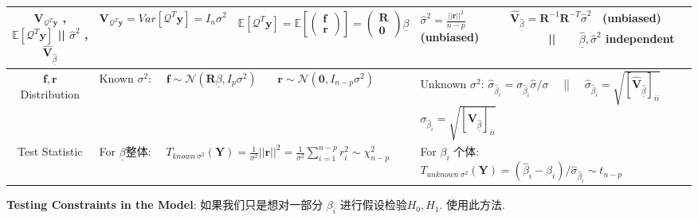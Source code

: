 \documentclass[9pt]{article}
\begin{document}
\vspace{-13pt}
{\footnotesize
\begin{longtable}{|c||l|l||l|l|}
    \hline
    {\scriptsize $\mathbf{V}_{\mathcal{Q}^T\mathbf{y}}$ , $\mathbb{E}[\mathcal{Q}^T\mathbf{y}]$ || $\widehat{\sigma}^2$ , $\widehat{\mathbf{V}}_{\underline{\widehat{\beta}}}$ } & $\mathbf{V}_{\mathcal{Q}^T\mathbf{y}}=Var[\mathcal{Q}^T\mathbf{y}]=I_n\sigma^2$ & {\tiny $\mathbb{E}[\mathcal{Q}^T\mathbf{y}]=\mathbb{E}\left[\begin{pmatrix}\mathbf{f} \\ \mathbf{r}\end{pmatrix}\right]=\begin{pmatrix}\mathbf{R} \\ \mathbf{0}\end{pmatrix}\underline{\beta}$} & $\widehat{\sigma}^2=\frac{||\mathbf{r}||^2}{n-p}$ {\tiny (unbiased)} & $\widehat{\mathbf{V}}_{\underline{\widehat{\beta}}}=\mathbf{R}^{-1}\mathbf{R}^{-T}\widehat{\sigma}^2$ \ {\tiny (unbiased)} \ \ \ \ \ \ || \ \ \ {\scriptsize $\underline{\widehat{\beta}},\widehat{\sigma}^2$ independent} \\
    \hline
    $\mathbf{f,r}$ Distribution & \multicolumn{2}{l||}{ {\scriptsize Known $\sigma^2$:} \ \ $\mathbf{f}\sim\mathcal{N}(\mathbf{R}\underline{\beta},I_p\sigma^2)$ \ \ \ $\mathbf{r}\sim\mathcal{N}(\mathbf{0},I_{n-p}\sigma^2)$} & \multicolumn{2}{l|}{ {\scriptsize Unknown $\sigma^2$:} $\widehat{\sigma}_{\widehat{\beta}_i}=\sigma_{\widehat{\beta}_i}\widehat{\sigma} / \sigma$ \ \ || \ \ $\widehat{\sigma}_{\widehat{\beta}_i}=\sqrt{[\widehat{\mathbf{V}}_{\underline{\widehat{\beta}}}]_{ii}}$ \ \ \ $\sigma_{\widehat{\beta}_i}=\sqrt{[\mathbf{V}_{\underline{\widehat{\beta}}}]_{ii}}$ } \\
    \hline
    Test Statistic & \multicolumn{2}{l||}{\scriptsize For $\underline{\beta}${\tiny 整体}: \ \ $T_{known \ \sigma^2}(\mathbf{Y})=\frac{1}{\sigma^2}||\mathbf{r}||^2=\frac{1}{\sigma^2}\sum^{n-p}_{i=1}r_i^2\sim\chi^2_{n-p}$} & \multicolumn{2}{l|}{\scriptsize For $\beta_i$ {\tiny 个体}: \ \ $T_{unknown \ \sigma^2}(\mathbf{Y})=(\widehat{\beta}_i-\beta_i)/ \widehat{\sigma}_{\widehat{\beta}_i}\sim t_{n-p}$} \\
    \hline
\end{longtable}
}
\vspace{-9pt}

\textbf{Testing Constraints in the Model}: {\footnotesize 如果我们只是想对一部分 $\beta_i$ 进行假设检验$H_0,H_1$. 使用此方法.}
\end{document}
